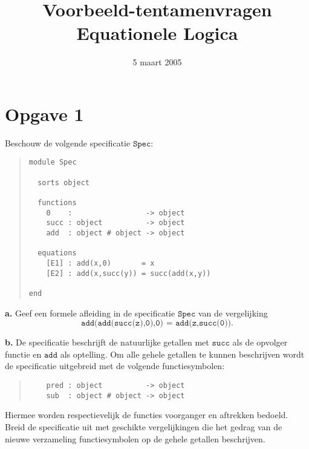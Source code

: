 \documentclass[a4paper,11pt]{article}
\title{Voorbeeld-tentamenvragen Equationele Logica}
\date{5 maart 2005}
\begin{document}
\maketitle


\section*{Opgave 1}

Beschouw de volgende specificatie $\texttt{Spec}$:

\begin{quote}
\begin{verbatim}
module Spec

  sorts object

  functions
    0    :                 -> object
    succ : object          -> object
    add  : object # object -> object

  equations
    [E1] : add(x,0)       = x
    [E2] : add(x,succ(y)) = succ(add(x,y))

end 
\end{verbatim}
\end{quote}

\begin{description}

\item{\bf a.}
Geef een formele afleiding in de specificatie $\texttt{Spec}$ van de
vergelijking
\begin{displaymath}
\texttt{add(add(succ(z),0),0) = add(z,succ(0))}.
\end{displaymath}

\item{\bf b.}
De specificatie beschrijft de natuurlijke getallen met $\texttt{succ}$ als de
opvolger functie en $\texttt{add}$ als optelling. Om alle gehele getallen te
kunnen beschrijven wordt de specificatie uitgebreid met de volgende
functiesymbolen:

\begin{quote}
\begin{verbatim}
    pred : object          -> object
    sub  : object # object -> object
\end{verbatim}
\end{quote}

Hiermee worden respectievelijk de functies voorganger en aftrekken
bedoeld. Breid de specificatie uit met geschikte vergelijkingen die het gedrag
van de nieuwe verzameling functiesymbolen op de gehele getallen beschrijven.

\end{description}
\end{document}
